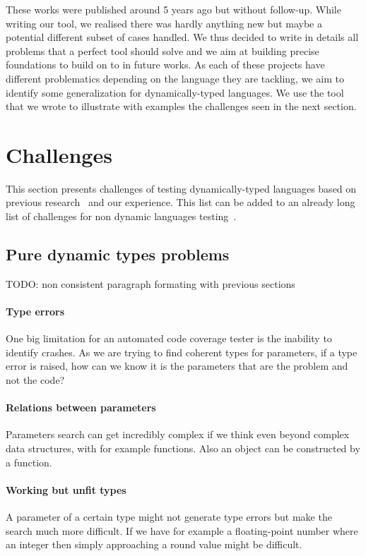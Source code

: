 \documentclass{llncs2e/llncs}
\makeatletter
\def\todo#1{{\color{red}TODO\@: #1}}
\makeatother
\begin{document}
These works were published around 5 years ago but without follow-up. While
writing our tool, we realised there was hardly anything new but maybe a
potential different subset of cases handled. We thus decided to write in details
all problems that a perfect tool should solve and we aim at building precise
foundations to build on to in future works. As each of these projects have
different problematics depending on the language they are tackling, we aim to
identify some generalization for dynamically-typed languages. We use the tool
that we wrote to illustrate with examples the challenges seen in the next
section.


\section{Challenges}
\label{challenges}

This section presents challenges of testing dynamically-typed languages based on
previous research~\cite{ducasse2011challenges} and our experience. This list
can be added to an already long list of challenges for non dynamic languages
testing~\cite{mcminn2011search}.

\subsection{Pure dynamic types problems}
\todo{non consistent paragraph formating with previous sections}
\paragraph{Type errors} One big limitation for an automated code coverage tester
is the inability to identify crashes. As we are trying to find coherent types
for parameters, if a type error is raised, how can we know it is the parameters
that are the problem and not the code?

\paragraph{Relations between parameters} Parameters search can get incredibly
complex if we think even beyond complex data structures, with for example
functions. Also an object can be constructed by a function.

\paragraph{Working but unfit types} A parameter of a certain type might not
generate type errors but make the search much more difficult. If we have for
example a floating-point number where an integer then simply approaching a round
value might be difficult.
\end{document}
